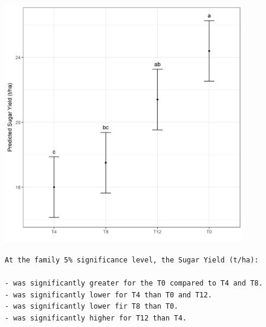 \documentclass[a4paper, 10pt, fleqn, twosided]{memoir}
\begin{document}
\begin{tcolorbox}[title = Exercise 6 output continued]
\includegraphics[width=0.8\textwidth, frame]{Exercise6Pred.png}

\end{tcolorbox}

\begin{tcolorbox}[title = Exercise 6 interpretation]
\begin{verbatim}
At the family 5% significance level, the Sugar Yield (t/ha):

- was significantly greater for the T0 compared to T4 and T8.
- was significantly lower for T4 than T0 and T12.
- was significantly lower fir T8 than T0.
- was significantly higher for T12 than T4.
\end{verbatim}
\end{tcolorbox}
\end{document}
